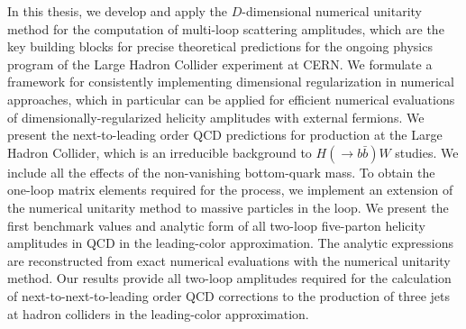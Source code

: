 In this thesis, we develop and apply the $D$-dimensional numerical unitarity method for
the computation of multi-loop scattering amplitudes, which
are the key building blocks for precise theoretical predictions for the ongoing physics program of the Large Hadron Collider experiment at CERN.
We formulate a framework for consistently implementing dimensional regularization in numerical approaches, which in particular
can be applied for efficient numerical evaluations of dimensionally-regularized helicity amplitudes with external fermions.
We present the next-to-leading order QCD predictions for \Wbbn{} production at the Large Hadron Collider,
which is an irreducible background to $H(\rightarrow b{\bar b})W$ studies.
We include all the effects of the non-vanishing bottom-quark mass. 
To obtain the one-loop matrix elements required for the process,
we implement an extension of the numerical unitarity method to massive particles in the loop.
We present the first benchmark values and analytic form of all two-loop five-parton helicity amplitudes in QCD in the leading-color approximation.
The analytic expressions are reconstructed from exact numerical evaluations with the numerical unitarity method.
Our results provide all two-loop
amplitudes required for the calculation of next-to-next-to-leading order
QCD corrections to the production of three jets at hadron colliders in
the leading-color approximation.


